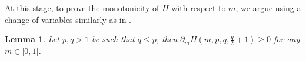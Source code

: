 \documentclass{amsart}
\newtheorem{lem}[thm]{Lemma}
\theoremstyle{definition}
\theoremstyle{remark}
\begin{document}
At this stage, to prove the monotonicity of $H$ with respect to $m$, we argue using a change of variables similarly as in \cite{GGR}. %
\begin{lem}
\label{Hdecr} Let $p,q>1$ be such that $q\le p$, then $\partial_mH(m,p,q,\frac q2 +1)\geq 0$ for any $m\in]0,1[$.
\end{lem}
\end{document}
